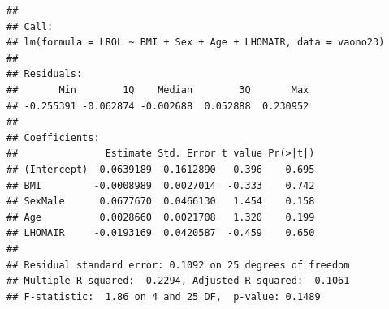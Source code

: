 \documentclass[
]{article}
\begin{document}
\begin{verbatim}
## 
## Call:
## lm(formula = LROL ~ BMI + Sex + Age + LHOMAIR, data = vaono23)
## 
## Residuals:
##       Min        1Q    Median        3Q       Max 
## -0.255391 -0.062874 -0.002688  0.052888  0.230952 
## 
## Coefficients:
##               Estimate Std. Error t value Pr(>|t|)
## (Intercept)  0.0639189  0.1612890   0.396    0.695
## BMI         -0.0008989  0.0027014  -0.333    0.742
## SexMale      0.0677670  0.0466130   1.454    0.158
## Age          0.0028660  0.0021708   1.320    0.199
## LHOMAIR     -0.0193169  0.0420587  -0.459    0.650
## 
## Residual standard error: 0.1092 on 25 degrees of freedom
## Multiple R-squared:  0.2294, Adjusted R-squared:  0.1061 
## F-statistic:  1.86 on 4 and 25 DF,  p-value: 0.1489
\end{verbatim}
\end{document}
